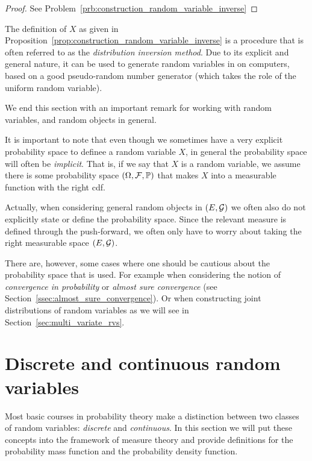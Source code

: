 \begin{proof}
See Problem~\ref{prb:construction_random_variable_inverse}
\end{proof}

The definition of $X$ as given in Proposition~\ref{prop:construction_random_variable_inverse} is a procedure that is often referred to as the \emph{distribution inversion method}. Due to its explicit and general nature, it can be used to generate random variables in on computers, based on a good pseudo-random number generator (which takes the role of the uniform random variable).

We end this section with an important remark for working with random variables, and random objects in general.

\begin{remark}
It is important to note that even though we sometimes have a very explicit probability space to definee a random variable $X$, in general the probability space will often be \emph{implicit}. That is, if we say that $X$ is a random variable, we assume there is some probability space $(\Omega,\mathcal F, \mathbb P)$ that makes $X$ into a measurable function with the right cdf. 

Actually, when considering general random objects in $(E, \mathcal G)$ we often also do not explicitly state or define the probability space. Since the relevant measure is defined through the push-forward, we often only have to worry about taking the right measurable space $(E, \mathcal G)$.

There are, however, some cases where one should be cautious about the probability space that is used. For example when considering the notion of \emph{convergence in probability} or \emph{almost sure convergence} (see Section~\ref{ssec:almost_sure_convergence}). Or when constructing joint distributions of random variables as we will see in Section~\ref{sec:multi_variate_rvs}. 
\end{remark}

\section{Discrete and continuous random variables}

Most basic courses in probability theory make a distinction between two classes of random variables: \emph{discrete} and \emph{continuous}. In this section we will put these concepts into the framework of measure theory and provide definitions for the probability mass function and the probability density function.

